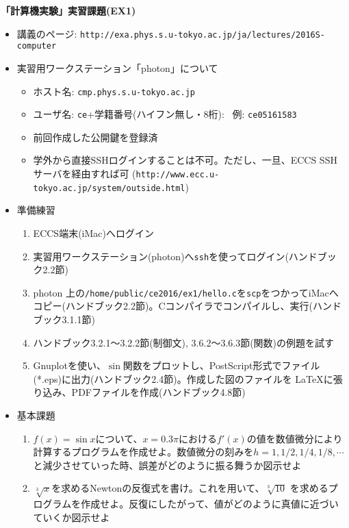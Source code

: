 \documentclass[11pt]{jarticle}
\begin{document}
\noindent
{\bf\large 「計算機実験」実習課題(EX1)}
\\[-0.5em]

\noindent
\begin{itemize}
\item 講義のページ: \verb+http://exa.phys.s.u-tokyo.ac.jp/ja/lectures/2016S-computer+

\item 実習用ワークステーション「photon」について
  \begin{itemize}
  \item ホスト名: {\tt cmp.phys.s.u-tokyo.ac.jp}
  \item ユーザ名: {\tt ce}+学籍番号(ハイフン無し・8桁): \ 例: {\tt ce05161583}
  \item 前回作成した公開鍵を登録済
  \item 学外から直接SSHログインすることは不可。ただし、一旦、ECCS SSHサーバを経由すれば可 (\verb+http://www.ecc.u-tokyo.ac.jp/system/outside.html+)
  \end{itemize}
  
\item 準備練習
  \begin{enumerate}
  \item ECCS端末(iMac)へログイン
  \item 実習用ワークステーション(photon)へ{\tt ssh}を使ってログイン(ハンドブック2.2節)
  \item photon 上の{\tt /home/public/ce2016/ex1/hello.c}を{\tt scp}をつかってiMacへコピー(ハンドブック2.2節)。Cコンパイラでコンパイルし、実行(ハンドブック3.1.1節)
  \item ハンドブック3.2.1〜3.2.2節(制御文), 3.6.2〜3.6.3節(関数)の例題を試す
  \item Gnuplotを使い、$\sin$関数をプロットし、PostScript形式でファイル(*.eps)に出力(ハンドブック2.4節)。作成した図のファイルを \LaTeX に張り込み、PDFファイルを作成(ハンドブック4.8節)
  \end{enumerate}

\item 基本課題
  \begin{enumerate}
  \item $f(x)=\sin x$について、$x=0.3\pi$における$f'(x)$の値を数値微分により計算するプログラムを作成せよ。数値微分の刻みを$h=1,1/2,1/4,1/8,\cdots$と減少させていった時、誤差がどのように振る舞うか図示せよ
  \item $\sqrt[3]{x}$を求めるNewtonの反復式を書け。これを用いて、$\sqrt[3]{10}$
    を求めるプログラムを作成せよ。反復にしたがって、値がどのように真値に近づいていくか図示せよ
  \end{enumerate}
  

\end{itemize}
\end{document}
